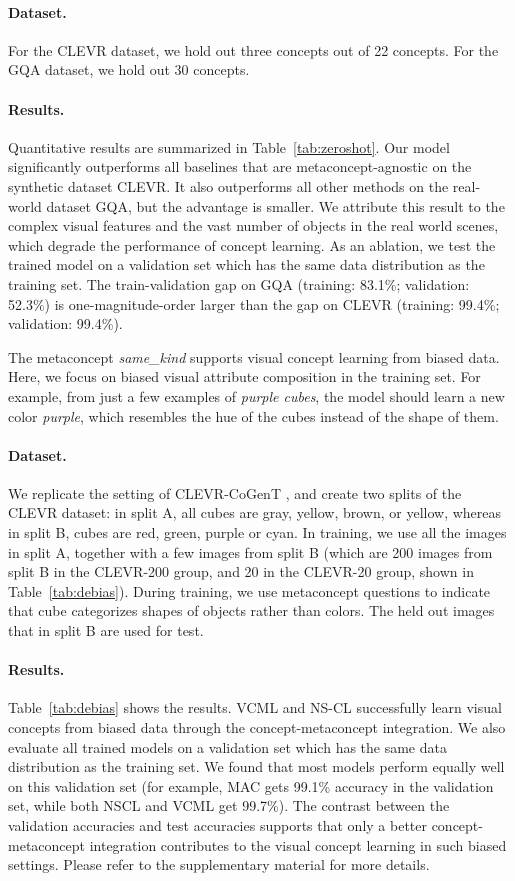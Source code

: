 \documentclass{article}
\newcommand{\tbl}[1]{Table~\ref{#1}}
\newcommand{\model}{VCML\xspace}
\newcommand{\myparagraph}[1]{\vspace{-10pt}\paragraph{#1}}
\begin{document}
\paragraph{Dataset.} For the CLEVR dataset, we hold out three concepts out of 22 concepts. For the GQA dataset, we hold out 30 concepts.

\myparagraph{Results.}
Quantitative results are summarized in \tbl{tab:zeroshot}. Our model significantly outperforms all baselines that are metaconcept-agnostic on the synthetic dataset CLEVR. It also outperforms all other methods on the real-world dataset GQA, but the advantage is smaller. We attribute this result to the complex visual features and the vast number of objects in the real world scenes, which degrade the performance of concept learning. As an ablation, we test the trained model on a validation set which has the same data distribution as the training set. The train-validation gap on GQA (training: 83.1\%; validation: 52.3\%) is one-magnitude-order larger than the gap on CLEVR (training: 99.4\%; validation: 99.4\%).



The metaconcept {\it same\_kind} supports visual concept learning from biased data. Here, we focus on biased visual attribute composition in the training set. For example, from just a few examples of {\it purple cubes}, the model should learn a new color {\it purple}, which resembles the hue of the cubes instead of the shape of them.



\myparagraph{Dataset.}
We replicate the setting of CLEVR-CoGenT \citep{Johnson2017CLEVR}, and create two splits of the CLEVR dataset: in split A, all cubes are gray, yellow, brown, or yellow, whereas in split B, cubes are red, green, purple or cyan. In training, we use all the images in split A, together with a few images from split B (which are 200 images from split B in the CLEVR-200 group, and 20 in the CLEVR-20 group, shown in \tbl{tab:debias}). During training, we use metaconcept questions to indicate that cube categorizes shapes of objects rather than colors. The held out images that in split B are used for test.

\myparagraph{Results.}
\tbl{tab:debias} shows the results. \model and NS-CL successfully learn visual concepts from biased data through the concept-metaconcept integration. We also evaluate all trained models on a validation set which has the same data distribution as the training set. We found that most models perform equally well on this validation set (for example, MAC gets 99.1\% accuracy in the validation set, while both NSCL and VCML get 99.7\%). The contrast between the validation accuracies and test accuracies supports that only a better concept-metaconcept integration contributes to the visual concept learning in such biased settings. Please refer to the supplementary material for more details.
\end{document}
